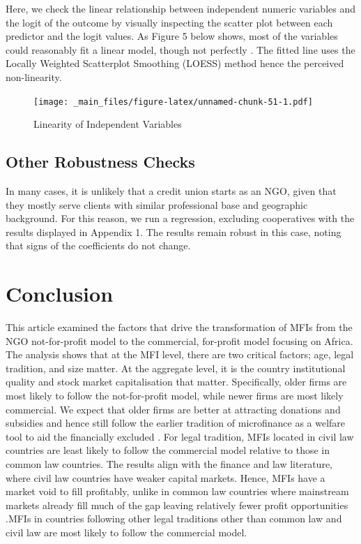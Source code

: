 \documentclass[a4paper, nobind]{templates/ociamthesis}
\begin{document}
Here, we check the linear relationship between independent numeric variables and the logit of the outcome by visually inspecting the scatter plot between each predictor and the logit values. As Figure 5 below shows, most of the variables could reasonably fit a linear model, though not perfectly \autocite{cheng2007testing}. The fitted line uses the Locally Weighted Scatterplot Smoothing (LOESS) method hence the perceived non-linearity.

\begin{landscape}

\begin{figure}
\centering
\texttt{[image: \_main\_files/figure-latex/unnamed-chunk-51-1.pdf]}
\caption{\label{fig:unnamed-chunk-51}Linearity of Independent Variables}
\end{figure}

\end{landscape}

\hypertarget{other-robustness-checks}{%
\subsection{Other Robustness Checks}\label{other-robustness-checks}}

In many cases, it is unlikely that a credit union starts as an NGO, given that they mostly serve clients with similar professional base and geographic background. For this reason, we run a regression, excluding cooperatives with the results displayed in Appendix 1. The results remain robust in this case, noting that signs of the coefficients do not change.

\hypertarget{conclusion}{%
\section{Conclusion}\label{conclusion}}

This article examined the factors that drive the transformation of MFIs from the NGO not-for-profit model to the commercial, for-profit model focusing on Africa. The analysis shows that at the MFI level, there are two critical factors; age, legal tradition, and size matter. At the aggregate level, it is the country institutional quality and stock market capitalisation that matter. Specifically, older firms are most likely to follow the not-for-profit model, while newer firms are most likely commercial. We expect that older firms are better at attracting donations and subsidies and hence still follow the earlier tradition of microfinance as a welfare tool to aid the financially excluded \autocite{d2017ngos}. For legal tradition, MFIs located in civil law countries are least likely to follow the commercial model relative to those in common law countries. The results align with the finance and law literature, where civil law countries have weaker capital markets. Hence, MFIs have a market void to fill profitably, unlike in common law countries where mainstream markets already fill much of the gap leaving relatively fewer profit opportunities \autocite{la2013law,schnyder2018twenty}.MFIs in countries following other legal traditions other than common law and civil law are most likely to follow the commercial model.
\end{document}
